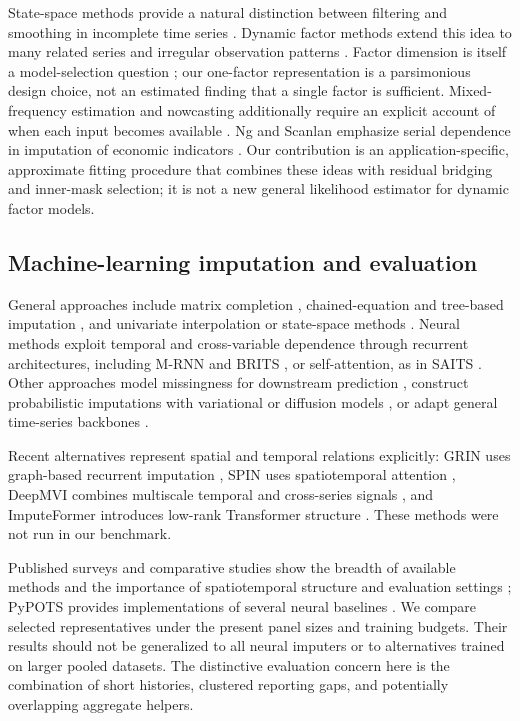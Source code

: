 \documentclass[sigconf,nonacm,balance=false]{acmart}
\begin{document}
State-space methods provide a natural distinction between filtering and smoothing in incomplete time series \cite{jones1980,harvey1984,kalman1960,rauch1965,durbin2012}. Dynamic factor methods extend this idea to many related series and irregular observation patterns \cite{stock2002,doz2012,banbura2014}. Factor dimension is itself a model-selection question \cite{bai2002}; our one-factor representation is a parsimonious design choice, not an estimated finding that a single factor is sufficient. Mixed-frequency estimation and nowcasting additionally require an explicit account of when each input becomes available \cite{chow1971,mariano2003,giannone2008}. Ng and Scanlan emphasize serial dependence in imputation of economic indicators \cite{ng2024}. Our contribution is an application-specific, approximate fitting procedure that combines these ideas with residual bridging and inner-mask selection; it is not a new general likelihood estimator for dynamic factor models.

\subsection{Machine-learning imputation and evaluation}

General approaches include matrix completion \cite{mazumder2010}, chained-equation and tree-based imputation \cite{vanbuuren2011,stekhoven2012}, and univariate interpolation or state-space methods \cite{moritz2017}. Neural methods exploit temporal and cross-variable dependence through recurrent architectures, including M-RNN and BRITS \cite{yoon2019,cao2018}, or self-attention, as in SAITS \cite{du2023saits}. Other approaches model missingness for downstream prediction \cite{che2018}, construct probabilistic imputations with variational or diffusion models \cite{fortuin2020,tashiro2021}, or adapt general time-series backbones \cite{wu2023}.

Recent alternatives represent spatial and temporal relations explicitly: GRIN uses graph-based recurrent imputation \cite{cini2022}, SPIN uses spatiotemporal attention \cite{marisca2022}, DeepMVI combines multiscale temporal and cross-series signals \cite{bansal2021}, and ImputeFormer introduces low-rank Transformer structure \cite{nie2024}. These methods were not run in our benchmark.

Published surveys and comparative studies show the breadth of available methods and the importance of spatiotemporal structure and evaluation settings \cite{wang2025,zahmatkesh2026,khayati2020}; PyPOTS provides implementations of several neural baselines \cite{du2023pypots}. We compare selected representatives under the present panel sizes and training budgets. Their results should not be generalized to all neural imputers or to alternatives trained on larger pooled datasets. The distinctive evaluation concern here is the combination of short histories, clustered reporting gaps, and potentially overlapping aggregate helpers.
\end{document}

